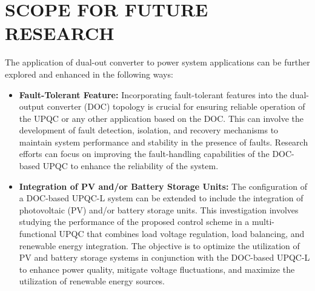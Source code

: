 \section{SCOPE FOR FUTURE RESEARCH}
The application of dual-out converter to power system applications can be further explored and enhanced in the following ways: 
\begin{itemize}
\item \textbf{Fault-Tolerant Feature:} Incorporating fault-tolerant features into the dual-output converter (DOC) topology is crucial for ensuring reliable operation of the UPQC or any other application based on the DOC. This can involve the development of fault detection, isolation, and recovery mechanisms to maintain system performance and stability in the presence of faults. Research efforts can focus on improving the fault-handling capabilities of the DOC-based UPQC to enhance the reliability of the system. 
    
\item \textbf{Integration of PV and/or Battery Storage Units:} The configuration of a DOC-based UPQC-L system can be extended to include the integration of photovoltaic (PV) and/or battery storage units. This investigation involves studying the performance of the proposed control scheme in a multi-functional UPQC that combines load voltage regulation, load balancing, and renewable energy integration. The objective is to optimize the utilization of PV and battery storage systems in conjunction with the DOC-based UPQC-L to enhance power quality, mitigate voltage fluctuations, and maximize the utilization of renewable energy sources.

\end{itemize}